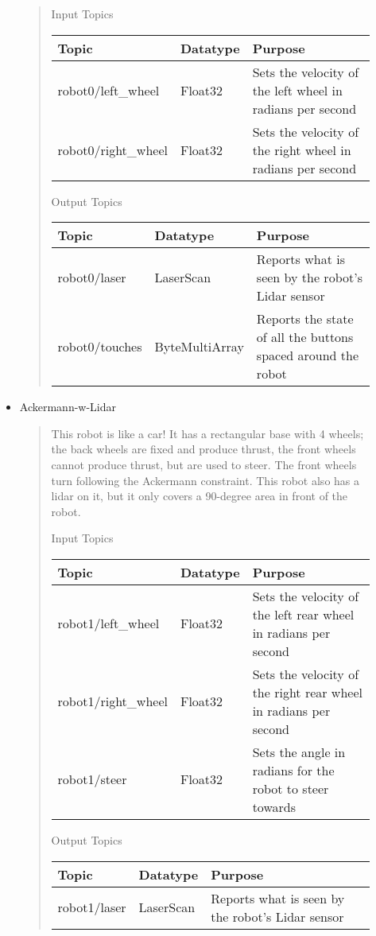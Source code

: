\begin{description}
\begin{itemize}
\begin{quote}
  Input Topics

  \begin{longtable}[]{@{}lll@{}}
  \toprule
  Topic & Datatype & Purpose\tabularnewline
  \midrule
  \endhead
  robot0/left\_wheel & Float32 & Sets the velocity of the left wheel in
  radians per second\tabularnewline
  robot0/right\_wheel & Float32 & Sets the velocity of the right wheel
  in radians per second\tabularnewline
  \bottomrule
  \end{longtable}

  Output Topics

  \begin{longtable}[]{@{}lll@{}}
  \toprule
  Topic & Datatype & Purpose\tabularnewline
  \midrule
  \endhead
  robot0/laser & LaserScan & Reports what is seen by the robot's Lidar
  sensor\tabularnewline
  robot0/touches & ByteMultiArray & Reports the state of all the buttons
  spaced around the robot\tabularnewline
  \bottomrule
  \end{longtable}
  \end{quote}
\item
  Ackermann-w-Lidar

  \begin{quote}
  This robot is like a car! It has a rectangular base with 4 wheels; the
  back wheels are fixed and produce thrust, the front wheels cannot
  produce thrust, but are used to steer. The front wheels turn following
  the Ackermann constraint. This robot also has a lidar on it, but it
  only covers a 90-degree area in front of the robot.

  Input Topics

  \begin{longtable}[]{@{}lll@{}}
  \toprule
  Topic & Datatype & Purpose\tabularnewline
  \midrule
  \endhead
  robot1/left\_wheel & Float32 & Sets the velocity of the left rear
  wheel in radians per second\tabularnewline
  robot1/right\_wheel & Float32 & Sets the velocity of the right rear
  wheel in radians per second\tabularnewline
  robot1/steer & Float32 & Sets the angle in radians for the robot to
  steer towards\tabularnewline
  \bottomrule
  \end{longtable}

  Output Topics

  \begin{longtable}[]{@{}lll@{}}
  \toprule
  Topic & Datatype & Purpose\tabularnewline
  \midrule
  \endhead
  robot1/laser & LaserScan & Reports what is seen by the robot's Lidar
  sensor\tabularnewline
  \bottomrule
  \end{longtable}
  \end{quote}
\end{itemize}
\end{description}

